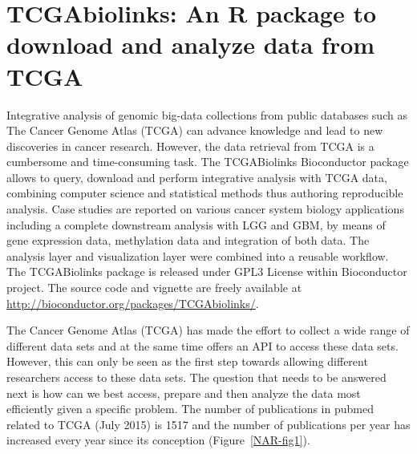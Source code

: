 \section{TCGAbiolinks: An R package to download and analyze data from TCGA}


 Integrative analysis of genomic big-data collections from public databases such as The Cancer Genome Atlas (TCGA) can advance knowledge and lead to new discoveries in cancer research.  However, the data retrieval from TCGA is a cumbersome and time-consuming task. The TCGABiolinks Bioconductor package allows to query, download and perform integrative analysis with TCGA data, combining computer science and statistical methods thus authoring reproducible analysis. 
  Case studies are reported on various cancer system biology applications including a complete downstream analysis with LGG and GBM, by means of gene expression data,  methylation data and integration of both data.
  The analysis layer and visualization layer were combined into a reusable workflow. 
  The TCGABiolinks package is released under GPL3 License within Bioconductor project. The source code and vignette are freely available at \url{http://bioconductor.org/packages/TCGAbiolinks/}.
  
  The Cancer Genome Atlas (TCGA) has made the effort to collect a wide range of different data sets and at the same time offers an API to access these data sets. However, this can only be seen as the first step towards allowing different researchers access to these data sets. The question that needs to be answered next is how can we best access, prepare and then analyze the data most efficiently given a specific problem. 
The number of publications in pubmed related to TCGA (July 2015) is 1517 and the number of publications per year has increased every year since its conception (Figure~\ref{NAR-fig1}).

